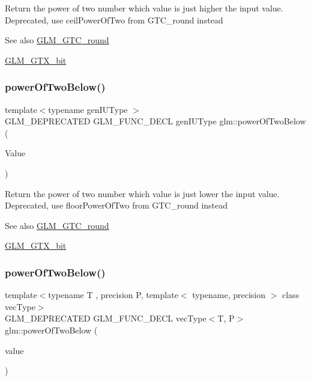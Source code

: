 Return the power of two number which value is just higher the input value. Deprecated, use ceil\+Power\+Of\+Two from G\+T\+C\+\_\+round instead

\begin{DoxySeeAlso}{See also}
\hyperlink{group__gtc__round}{G\+L\+M\+\_\+\+G\+T\+C\+\_\+round} 

\hyperlink{group__gtx__bit}{G\+L\+M\+\_\+\+G\+T\+X\+\_\+bit} 
\end{DoxySeeAlso}
\mbox{\label{group__gtx__bit_ga3de7df63c589325101a2817a56f8e29d}} 
\subsubsection{\texorpdfstring{power\+Of\+Two\+Below()}{powerOfTwoBelow()}\hspace{0.1cm}{\footnotesize\ttfamily [1/2]}}
{\footnotesize\ttfamily template$<$typename gen\+I\+U\+Type $>$ \\
G\+L\+M\+\_\+\+D\+E\+P\+R\+E\+C\+A\+T\+ED G\+L\+M\+\_\+\+F\+U\+N\+C\+\_\+\+D\+E\+CL gen\+I\+U\+Type glm\+::power\+Of\+Two\+Below (\begin{DoxyParamCaption}\item[{gen\+I\+U\+Type}]{Value }\end{DoxyParamCaption})}

Return the power of two number which value is just lower the input value. Deprecated, use floor\+Power\+Of\+Two from G\+T\+C\+\_\+round instead

\begin{DoxySeeAlso}{See also}
\hyperlink{group__gtc__round}{G\+L\+M\+\_\+\+G\+T\+C\+\_\+round} 

\hyperlink{group__gtx__bit}{G\+L\+M\+\_\+\+G\+T\+X\+\_\+bit} 
\end{DoxySeeAlso}
\mbox{\label{group__gtx__bit_gae33bb1ca2b55846b23a0f0796a679195}} 
\subsubsection{\texorpdfstring{power\+Of\+Two\+Below()}{powerOfTwoBelow()}\hspace{0.1cm}{\footnotesize\ttfamily [2/2]}}
{\footnotesize\ttfamily template$<$typename T , precision P, template$<$ typename, precision $>$ class vec\+Type$>$ \\
G\+L\+M\+\_\+\+D\+E\+P\+R\+E\+C\+A\+T\+ED G\+L\+M\+\_\+\+F\+U\+N\+C\+\_\+\+D\+E\+CL vec\+Type$<$T, P$>$ glm\+::power\+Of\+Two\+Below (\begin{DoxyParamCaption}\item[{vec\+Type$<$ T, P $>$ const \&}]{value }\end{DoxyParamCaption})}

